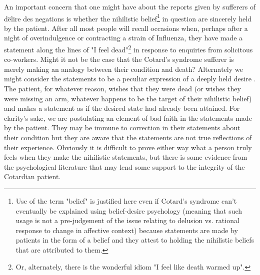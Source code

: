 An important concern that one might have about the reports given by sufferers of d\"{e}lire des negations is whether the nihilistic belief\footnote{Use of the term "belief" is justified here even if Cotard's syndrome can't eventually be explained using belief-desire psychology (meaning that such usage is not a pre-judgement of the issue relating to delusion vs. rational response to change in affective context) because statements are made by patients in the form of a belief and they attest to holding the nihilistic beliefs that are attributed to them.} in question are sincerely held by the patient. After all most people will recall occasions when, perhaps after a night of overindulgence or contracting a strain of Influenza, they have made a statement along the lines of "I feel dead"\footnote{Or, alternately, there is the wonderful idiom "I feel like death warmed up".} in response to enquiries from solicitous co-workers. Might it not be the case that the Cotard's syndrome sufferer is merely making an analogy between their condition and death? Alternately we might consider the statements to be a peculiar expression of a deeply held desire \cite{turnbull2004}. The patient, for whatever reason, wishes that they were dead (or wishes they were missing an arm, whatever happens to be the target of their nihilistic belief) and makes a statement as if the desired state had already been attained. For clarity's sake, we are postulating an element of bad faith in the statements made by the patient. They may be immune to correction in their statements about their condition but they are aware that the statements are not true reflections of their experience. Obviously it is difficult to prove either way what a person truly feels when they make the nihilistic statements, but there is some evidence from the psychological literature that may lend some support to the integrity of the Cotardian patient.

